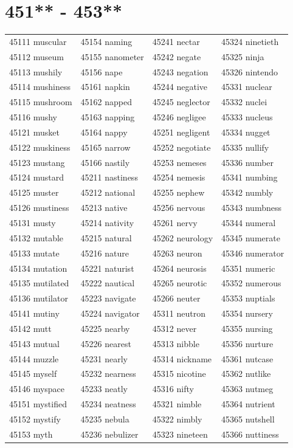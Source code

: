 \documentclass[10pt, oneside]{book}
\begin{document}
\begin{table}
	\centering
	\section*{451** - 453**}
	\begin{tabular}{l l l l}
45111 muscular &45154 naming &45241 nectar &45324 ninetieth\\
45112 museum &45155 nanometer &45242 negate &45325 ninja\\
45113 mushily &45156 nape &45243 negation &45326 nintendo\\
45114 mushiness &45161 napkin &45244 negative &45331 nuclear\\
45115 mushroom &45162 napped &45245 neglector &45332 nuclei\\
45116 mushy &45163 napping &45246 negligee &45333 nucleus\\
45121 musket &45164 nappy &45251 negligent &45334 nugget\\
45122 muskiness &45165 narrow &45252 negotiate &45335 nullify\\
45123 mustang &45166 nastily &45253 nemeses &45336 number\\
45124 mustard &45211 nastiness &45254 nemesis &45341 numbing\\
45125 muster &45212 national &45255 nephew &45342 numbly\\
45126 mustiness &45213 native &45256 nervous &45343 numbness\\
45131 musty &45214 nativity &45261 nervy &45344 numeral\\
45132 mutable &45215 natural &45262 neurology &45345 numerate\\
45133 mutate &45216 nature &45263 neuron &45346 numerator\\
45134 mutation &45221 naturist &45264 neurosis &45351 numeric\\
45135 mutilated &45222 nautical &45265 neurotic &45352 numerous\\
45136 mutilator &45223 navigate &45266 neuter &45353 nuptials\\
45141 mutiny &45224 navigator &45311 neutron &45354 nursery\\
45142 mutt &45225 nearby &45312 never &45355 nursing\\
45143 mutual &45226 nearest &45313 nibble &45356 nurture\\
45144 muzzle &45231 nearly &45314 nickname &45361 nutcase\\
45145 myself &45232 nearness &45315 nicotine &45362 nutlike\\
45146 myspace &45233 neatly &45316 nifty &45363 nutmeg\\
45151 mystified &45234 neatness &45321 nimble &45364 nutrient\\
45152 mystify &45235 nebula &45322 nimbly &45365 nutshell\\
45153 myth &45236 nebulizer &45323 nineteen &45366 nuttiness\\
	\end{tabular}
 \end{table}
\clearpage
\end{document}
